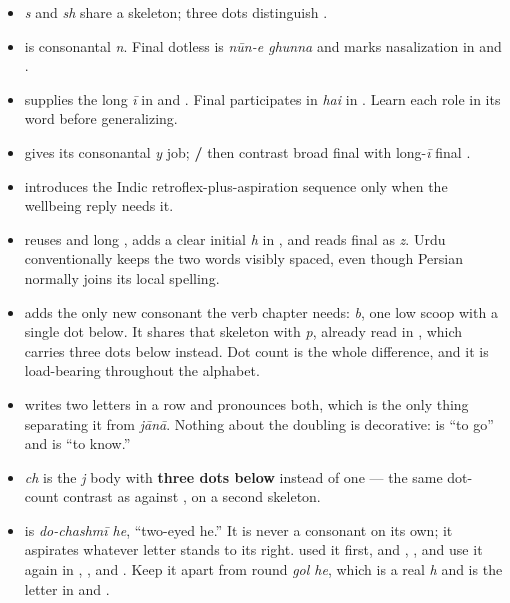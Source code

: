 \begin{itemize}
\raggedright
\setlength{\itemsep}{0.35em}
  \item \textbf{} \emph{s} and \textbf{} \emph{sh} share a skeleton; three dots distinguish \textbf{}.
  \item \textbf{} is consonantal \emph{n}. Final dotless \textbf{} is \emph{nūn-e ghunna} and marks nasalization in \textbf{} and \textbf{}.
  \item \textbf{} supplies the long \emph{ī} in \textbf{} and \textbf{}. Final \textbf{} participates in \emph{hai} in \textbf{}. Learn each role in its word before generalizing.
  \item \textbf{} gives \textbf{} its consonantal \emph{y} job; \textbf{ / } then contrast broad final \textbf{} with long-\emph{ī} final \textbf{}.
  \item \textbf{} introduces the Indic retroflex-plus-aspiration sequence \textbf{} only when the wellbeing reply needs it.
  \item \textbf{ } reuses \textbf{} and long \textbf{}, adds a clear initial \emph{h} in \textbf{}, and reads final \textbf{} as \emph{z}. Urdu conventionally keeps the two words visibly spaced, even though Persian normally joins its local spelling.
  \item \textbf{} adds the only new consonant the verb chapter needs: \textbf{} \emph{b}, one low scoop with a single dot below. It shares that skeleton with \textbf{} \emph{p}, already read in \textbf{}, which carries three dots below instead. Dot count is the whole difference, and it is load-bearing throughout the alphabet.
  \item \textbf{} writes two \textbf{} letters in a row and pronounces both, which is the only thing separating it from \textbf{} \emph{jānā}. Nothing about the doubling is decorative: \textbf{} is “to go” and \textbf{} is “to know.”
  \item \textbf{} \emph{ch} is the \textbf{} \emph{j} body with \textbf{three dots below} instead of one — the same dot-count contrast as \textbf{} against \textbf{}, on a second skeleton.
  \item \textbf{} is \emph{do-chashmī he}, “two-eyed he.” It is never a consonant on its own; it aspirates whatever letter stands to its right. \textbf{} used it first, and \textbf{}, \textbf{}, \textbf{} and \textbf{} use it again in \textbf{}, \textbf{}, \textbf{} and \textbf{}. Keep it apart from round \textbf{} \emph{gol he}, which is a real \emph{h} and is the letter in \textbf{} and \textbf{}.

\end{itemize}
